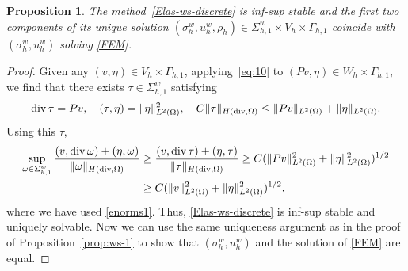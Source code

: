 \documentclass[12pt]{amsart}
\numberwithin{equation}{section}
\newcommand{\og}{\omega}
\DeclareMathOperator{\divg}{div}
\newtheorem{proposition}[theorem]{Proposition}
\theoremstyle{definition}
\theoremstyle{remark}
\newcommand{\om}{{\Omega}}
\renewcommand{\(}{\bigl(}
\renewcommand{\)}{\bigr)}
\renewcommand\div{\operatorname{div}}
\newcommand{\dive}{{\ensuremath\mathop{\mathrm{div}\,}}} %
\newcommand{\SW}{\Sigma^w}
\begin{document}
\begin{proposition}
  The method~\eqref{Elas-ws-discrete} is inf-sup stable and the first
  two components of its unique solution
  $(\sigma_h^w, u_h^w, \rho_h) \in \SW_{h,1} \times V_h \times \Gamma_{h,1}$
  coincide with $(\sigma_h^{w}, u_h^{w} )$ solving \eqref{FEM}.
\end{proposition}
\begin{proof}
  Given any $(v, \eta)\in V_h \times \Gamma_{h,1}$, applying~\eqref{eq:10}
  to $(Pv, \eta) \in W_h \times \Gamma_{h,1}$, we find that
  there exists $\tau \in \SW_{h,1}$ satisfying
  \begin{equation}
    \label{eq:10-B}
    \dive \tau = Pv, \quad
    (\tau, \eta) = \| \eta \|_{L^2(\Omega)}^2, \quad 
    C\| \tau \|_{H(\div,\Omega)} \le
    \| P v\|_{L^2(\Omega)} + \| \eta \|_{L^2(\Omega)}.
  \end{equation}
  Using this $\tau$, 
  \begin{align*}
    \sup_{\og \in \SW_{h,1}}
    \frac{(v, \dive \og)+(\eta, \og)}{\| \og\|_{H(\divg, \om)} }
    & \ge
      \frac{(v, \dive \tau)+(\eta, \tau)}{\| \tau\|_{H(\divg, \om)} }
      \ge C ( \| Pv \|^2_{L^2(\om)} + \| \eta \|_{L^2(\om)}^2)^{1/2}
    \\
    & \ge C ( \| v \|^2_{L^2(\om)} + \| \eta \|^2_{L^2(\om)})^{1/2},
  \end{align*}
  where we have used \eqref{enorms1}. Thus, \eqref{Elas-ws-discrete}
  is inf-sup stable and uniquely solvable.  Now we can use the same
  uniqueness argument as in the proof of Proposition~\ref{prop:ws-1}
  to show that $(\sigma_h^{w}, u_h^{w} )$ and the solution of
  \eqref{FEM} are equal.
\end{proof}


\end{document}
